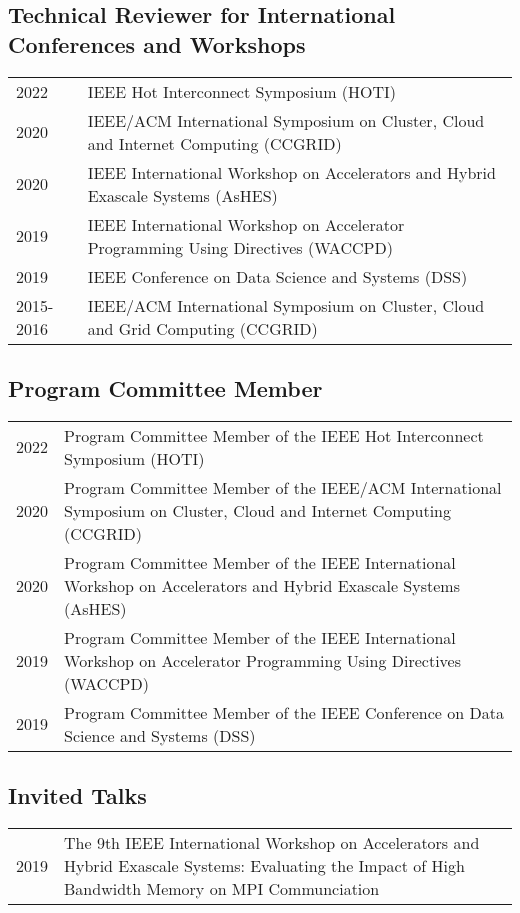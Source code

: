 \documentclass[a4paper,10pt]{article}
\begin{document}
\subsection*{Technical Reviewer for International Conferences and Workshops}
\begin{tabular}{p{1.45cm}p{11cm}}
    2022 & IEEE Hot Interconnect Symposium (HOTI) \\
    2020 & IEEE/ACM International Symposium on Cluster, Cloud and Internet Computing (CCGRID)\\
    2020 & IEEE International Workshop on Accelerators and Hybrid Exascale Systems (AsHES)\\
    2019 & IEEE International Workshop on Accelerator Programming Using Directives (WACCPD)\\
    2019 & IEEE Conference on Data Science and Systems (DSS)\\
    2015-2016 & IEEE/ACM International Symposium on Cluster, Cloud and Grid Computing (CCGRID)\\
\end{tabular}

\subsection*{Program Committee Member}
\begin{tabular}{p{1.45cm}p{11cm}}
    2022 & Program Committee Member of the IEEE Hot Interconnect Symposium (HOTI) \\
    2020 & Program Committee Member of the IEEE/ACM International Symposium on Cluster, Cloud and Internet Computing (CCGRID)\\
    2020 & Program Committee Member of the IEEE International Workshop on Accelerators and Hybrid Exascale Systems (AsHES)\\
    2019 & Program Committee Member of the IEEE International Workshop on Accelerator Programming Using Directives (WACCPD)\\
    2019 & Program Committee Member of the IEEE Conference on Data Science and Systems (DSS)\\
\end{tabular}

\subsection*{Invited Talks}
\begin{tabular}{p{1.45cm}p{11cm}}
    2019 & The 9th IEEE International Workshop on Accelerators and Hybrid Exascale Systems: Evaluating the Impact of High Bandwidth Memory on MPI Communciation\\
\end{tabular}
\end{document}
